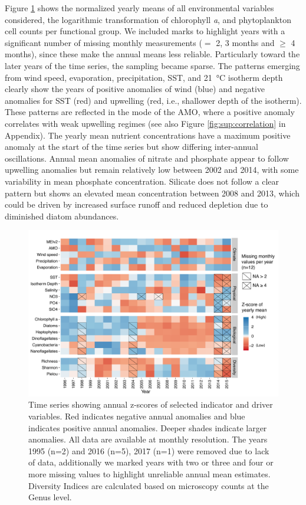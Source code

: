 \documentclass[draft]{agujournal2019}
\begin{document}
Figure \ref{fig:zscore} shows the normalized yearly means of all environmental variables considered, the logarithmic transformation of chlorophyll \textit{a}, and phytoplankton cell counts per functional group. We included marks to highlight years with a significant number of missing monthly measurements ($=$ 2, 3 months and $\geq$ 4 months), since these make the annual means less reliable. Particularly toward the later years of the time series, the sampling became sparse. The patterns emerging from wind speed, evaporation, precipitation, SST, and \qty{21}{\celsius} isotherm depth clearly show the years of positive anomalies of wind (blue) and negative anomalies for SST (red) and upwelling (red, i.e., shallower depth of the isotherm). These patterns are reflected in the mode of the AMO, where a positive anomaly correlates with weak upwelling regimes (see also Figure \ref{fig:sup:correlation} in Appendix). The yearly mean nutrient concentrations have a maximum positive anomaly at the start of the time series but show differing inter-annual oscillations. Annual mean anomalies of nitrate and phosphate appear to follow upwelling anomalies but remain relatively low between 2002 and 2014, with some variability in mean phosphate concentration. Silicate does not follow a clear pattern but shows an elevated mean concentration between 2008 and 2013, which could be driven by increased surface runoff \cite{lorenzoni_characterization_2015} and reduced depletion due to diminished diatom abundances.

\begin{figure}
\noindent\includegraphics[width=\textwidth]{fig/Figure2_ZScores_v2.pdf}
\caption{Time series showing annual z-scores of selected indicator and driver variables. Red indicates negative annual anomalies and blue indicates positive annual anomalies. Deeper shades indicate larger anomalies. All data are available at monthly resolution. The years 1995 (n=2) and 2016 (n=5), 2017 (n=1) were removed due to lack of data, additionally we marked years with two or three and four or more missing values to highlight unreliable annual mean estimates. Diversity Indices are calculated based on microscopy counts at the Genus level.}
\label{fig:zscore}
\end{figure}
\end{document}
